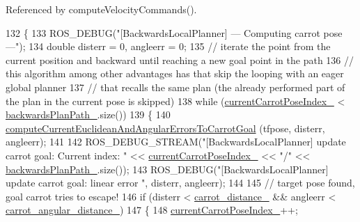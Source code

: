 Referenced by compute\+Velocity\+Commands().


\begin{DoxyCode}
132         \{
133             ROS\_DEBUG(\textcolor{stringliteral}{"[BackwardsLocalPlanner] --- Computing carrot pose ---"});
134             \textcolor{keywordtype}{double} disterr = 0, angleerr = 0;
135             \textcolor{comment}{// iterate the point from the current position and backward until reaching a new goal point in
       the path}
136             \textcolor{comment}{// this algorithm among other advantages has that skip the looping with an eager global planner}
137             \textcolor{comment}{// that recalls the same plan (the already performed part of the plan in the current pose is
       skipped)}
138             \textcolor{keywordflow}{while} (\hyperlink{classcl__move__base__z_1_1backward__local__planner_1_1BackwardLocalPlanner_a2e8f2b78bc97f27c5fa431f3af2261ed}{currentCarrotPoseIndex\_} < 
      \hyperlink{classcl__move__base__z_1_1backward__local__planner_1_1BackwardLocalPlanner_ad9cde5c85f782cab2ddb4030e3c3f2cf}{backwardsPlanPath\_}.size())
139             \{
140                 \hyperlink{classcl__move__base__z_1_1backward__local__planner_1_1BackwardLocalPlanner_ad39ba029c760fc63ea286c74b5b9b795}{computeCurrentEuclideanAndAngularErrorsToCarrotGoal}
      (tfpose, disterr, angleerr);
141 
142                 ROS\_DEBUG\_STREAM(\textcolor{stringliteral}{"[BackwardsLocalPlanner] update carrot goal: Current index: "} << 
      \hyperlink{classcl__move__base__z_1_1backward__local__planner_1_1BackwardLocalPlanner_a2e8f2b78bc97f27c5fa431f3af2261ed}{currentCarrotPoseIndex\_} << \textcolor{stringliteral}{"/"} << \hyperlink{classcl__move__base__z_1_1backward__local__planner_1_1BackwardLocalPlanner_ad9cde5c85f782cab2ddb4030e3c3f2cf}{backwardsPlanPath\_}.size());
143                 ROS\_DEBUG(\textcolor{stringliteral}{"[BackwardsLocalPlanner] update carrot goal: linear error %
      "}, disterr, angleerr);
144 
145                 \textcolor{comment}{// target pose found, goal carrot tries to escape!}
146                 \textcolor{keywordflow}{if} (disterr < \hyperlink{classcl__move__base__z_1_1backward__local__planner_1_1BackwardLocalPlanner_a0bbb80ce5bae865c4322869422803296}{carrot\_distance\_} && angleerr < 
      \hyperlink{classcl__move__base__z_1_1backward__local__planner_1_1BackwardLocalPlanner_a63e30befa09c4a67cf55086923b760c7}{carrot\_angular\_distance\_})
147                 \{
148                     \hyperlink{classcl__move__base__z_1_1backward__local__planner_1_1BackwardLocalPlanner_a2e8f2b78bc97f27c5fa431f3af2261ed}{currentCarrotPoseIndex\_}++;

\end{DoxyCode}
